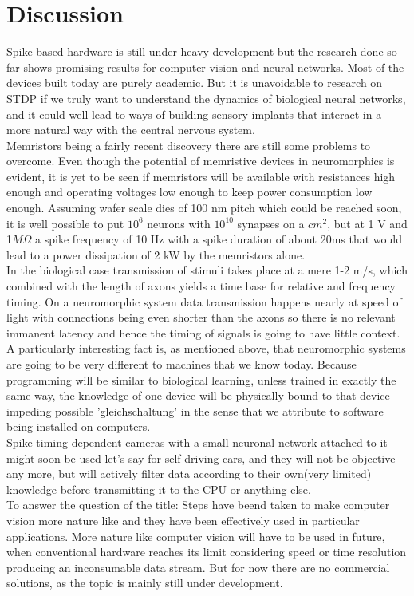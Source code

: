 \documentclass{SeminarV2}
\begin{document}
\section{Discussion}
Spike based hardware is still under heavy development but the research done so far shows promising results for computer vision and neural networks. Most of the devices built today are purely academic. 
But it is unavoidable to research on STDP if we truly want to understand the dynamics of biological neural networks, and it could well lead to ways of building sensory implants that interact in a more natural way with the central nervous system.\\
Memristors being a fairly recent discovery there are still some problems to overcome. Even though the potential of memristive devices in neuromorphics is evident, it is yet to be seen if memristors will be available with resistances high enough and operating voltages low enough to keep power consumption low enough. Assuming wafer scale dies of 100 nm pitch which could be reached soon, it is well possible to put $10^6$ neurons with $10^{10}$ synapses on a $cm^2$, but at 1 V and 1$M\Omega$ a spike frequency of 10 Hz with a spike duration of about 20ms that would lead to a power dissipation of 2 kW by the memristors alone.\\
In the biological case transmission of stimuli takes place at a mere 1-2 m/s, which combined with the length of axons yields a time base for relative and frequency timing. On a neuromorphic system data transmission happens nearly at speed of light with connections being even shorter than the axons so there is no relevant immanent latency and hence the timing of signals is going to have little context.\\
A particularly interesting fact is, as mentioned above, that neuromorphic systems are going to be very different to machines that we know today. Because programming will be similar to biological learning, unless trained in exactly the same way, the knowledge of one device will be physically bound to that device impeding possible 'gleichschaltung' in the sense that we attribute to software being installed on computers.\\
Spike timing dependent cameras with a small neuronal network attached to it might soon be used let's say for self driving cars, and they will not be objective any more, but will actively filter data according to their own(very limited) knowledge before transmitting it to the CPU or anything else.\\
To answer the question of the title: Steps have beend taken to make computer vision more nature like and they have been effectively used in particular applications. More nature like computer vision will have to be used in future, when conventional hardware reaches its limit considering speed or time resolution producing an inconsumable data stream. But for now there are no commercial solutions, as the topic is mainly still under development.
\iffalse
there are 10e11 neurons in the human brain, each having up to 15.000 synapses thus 10e15 synapses which is equivalent to petabyte
\fi
\end{document}
